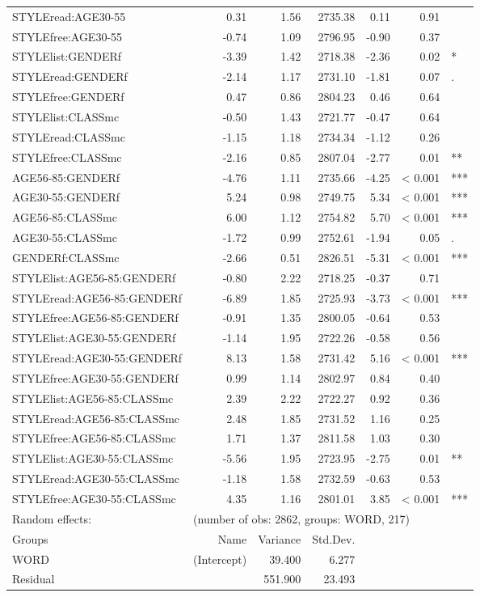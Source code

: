 {\begin{longtable}[c]{p{}rrrrrl}
		STYLEread:AGE30-55 & 0.31 & 1.56 & 2735.38 & 0.11 & 0.91 & \\ 
		STYLEfree:AGE30-55 & -0.74 & 1.09 & 2796.95 & -0.90 & 0.37 & \\ 
		STYLElist:GENDERf & -3.39 & 1.42 & 2718.38 & -2.36 & 0.02 & * \\ 
		STYLEread:GENDERf & -2.14 & 1.17 & 2731.10 & -1.81 & 0.07 & . \\ 
		STYLEfree:GENDERf & 0.47 & 0.86 & 2804.23 & 0.46 & 0.64 & \\ 
		STYLElist:CLASSmc & -0.50 & 1.43 & 2721.77 & -0.47 & 0.64 & \\ 
		STYLEread:CLASSmc & -1.15 & 1.18 & 2734.34 & -1.12 & 0.26 & \\ 
		STYLEfree:CLASSmc & -2.16 & 0.85 & 2807.04 & -2.77 & 0.01 & ** \\ 
		AGE56-85:GENDERf & -4.76 & 1.11 & 2735.66 & -4.25 & < 0.001 & *** \\ 
		AGE30-55:GENDERf & 5.24 & 0.98 & 2749.75 & 5.34 & < 0.001 & *** \\ 
		AGE56-85:CLASSmc & 6.00 & 1.12 & 2754.82 & 5.70 & < 0.001 & *** \\ 
		AGE30-55:CLASSmc & -1.72 & 0.99 & 2752.61 & -1.94 & 0.05 & . \\ 
		GENDERf:CLASSmc & -2.66 & 0.51 & 2826.51 & -5.31 & < 0.001 & *** \\ 
		STYLElist:AGE56-85:GENDERf & -0.80 & 2.22 & 2718.25 & -0.37 & 0.71 & \\ 
		STYLEread:AGE56-85:GENDERf & -6.89 & 1.85 & 2725.93 & -3.73 & < 0.001 & *** \\ 
		STYLEfree:AGE56-85:GENDERf & -0.91 & 1.35 & 2800.05 & -0.64 & 0.53 & \\ 
		STYLElist:AGE30-55:GENDERf & -1.14 & 1.95 & 2722.26 & -0.58 & 0.56 & \\ 
		STYLEread:AGE30-55:GENDERf & 8.13 & 1.58 & 2731.42 & 5.16 & < 0.001 & *** \\ 
		STYLEfree:AGE30-55:GENDERf & 0.99 & 1.14 & 2802.97 & 0.84 & 0.40 & \\ 
		STYLElist:AGE56-85:CLASSmc & 2.39 & 2.22 & 2722.27 & 0.92 & 0.36 & \\ 
		STYLEread:AGE56-85:CLASSmc & 2.48 & 1.85 & 2731.52 & 1.16 & 0.25 & \\ 
		STYLEfree:AGE56-85:CLASSmc & 1.71 & 1.37 & 2811.58 & 1.03 & 0.30 & \\ 
		STYLElist:AGE30-55:CLASSmc & -5.56 & 1.95 & 2723.95 & -2.75 & 0.01 & ** \\ 
		STYLEread:AGE30-55:CLASSmc & -1.18 & 1.58 & 2732.59 & -0.63 & 0.53 & \\ 
		STYLEfree:AGE30-55:CLASSmc & 4.35 & 1.16 & 2801.01 & 3.85 & < 0.001 & *** \\
		\hline
		Random effects: & \multicolumn{6}{l}{(number of obs: 2862, groups: WORD, 217)} \\
		Groups &         Name & Variance &      Std.Dev. & & & \\
		WORD &  (Intercept) & 39.400 & 6.277 & & & \\
		Residual  &         & 551.900 & 23.493 & & & \\
		\hline
	\end{longtable}
}

